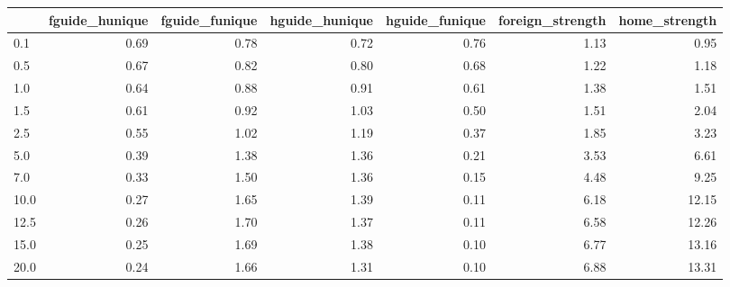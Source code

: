 \begin{tabular}{lrrrrrr}
\toprule
 & fguide_hunique & fguide_funique & hguide_hunique & hguide_funique & foreign_strength & home_strength \\
\midrule
0.1 & 0.69 & 0.78 & 0.72 & 0.76 & 1.13 & 0.95 \\
0.5 & 0.67 & 0.82 & 0.80 & 0.68 & 1.22 & 1.18 \\
1.0 & 0.64 & 0.88 & 0.91 & 0.61 & 1.38 & 1.51 \\
1.5 & 0.61 & 0.92 & 1.03 & 0.50 & 1.51 & 2.04 \\
2.5 & 0.55 & 1.02 & 1.19 & 0.37 & 1.85 & 3.23 \\
5.0 & 0.39 & 1.38 & 1.36 & 0.21 & 3.53 & 6.61 \\
7.0 & 0.33 & 1.50 & 1.36 & 0.15 & 4.48 & 9.25 \\
10.0 & 0.27 & 1.65 & 1.39 & 0.11 & 6.18 & 12.15 \\
12.5 & 0.26 & 1.70 & 1.37 & 0.11 & 6.58 & 12.26 \\
15.0 & 0.25 & 1.69 & 1.38 & 0.10 & 6.77 & 13.16 \\
20.0 & 0.24 & 1.66 & 1.31 & 0.10 & 6.88 & 13.31 \\
\bottomrule
\end{tabular}
